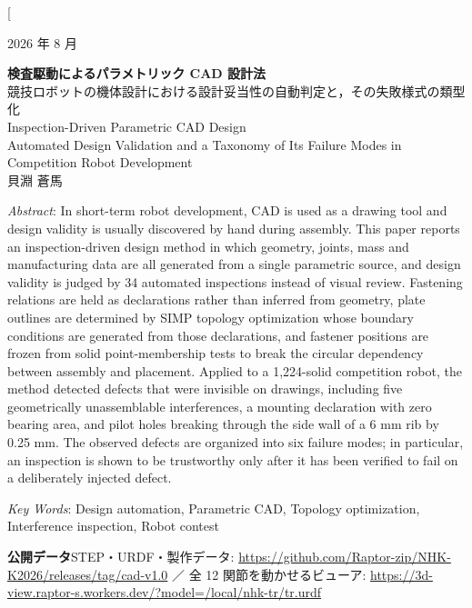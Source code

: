 \documentclass[a4paper,9pt,twocolumn]{ltjsarticle}
\begin{document}
\twocolumn[
\begin{@twocolumnfalse}
\begin{flushright}\footnotesize 2026 年 8 月\end{flushright}
\vspace{-2mm}
\begin{center}
{\large\bfseries 検査駆動によるパラメトリック CAD 設計法}\\
\vspace{1mm}
{\normalsize 競技ロボットの機体設計における設計妥当性の自動判定と，その失敗様式の類型化}\\
\vspace{2mm}
{\normalsize Inspection-Driven Parametric CAD Design}\\
{\footnotesize Automated Design Validation and a Taxonomy of Its Failure Modes
in Competition Robot Development}\\
\vspace{2mm}
{\normalsize 貝淵 蒼馬}
\end{center}
\vspace{1mm}

\begin{center}\vspace{-2mm}
\begin{minipage}{0.93\textwidth}
\footnotesize
\textit{Abstract}: In short-term robot development, CAD is used as a drawing tool
and design validity is usually discovered by hand during assembly.
This paper reports an inspection-driven design method in which geometry, joints,
mass and manufacturing data are all generated from a single parametric source,
and design validity is judged by 34 automated inspections instead of visual review.
Fastening relations are held as declarations rather than inferred from geometry,
plate outlines are determined by SIMP topology optimization whose boundary
conditions are generated from those declarations, and fastener positions are
frozen from solid point-membership tests to break the circular dependency
between assembly and placement.
Applied to a 1,224-solid competition robot, the method detected defects that were
invisible on drawings, including five geometrically unassemblable interferences,
a mounting declaration with zero bearing area, and pilot holes breaking through
the side wall of a 6 mm rib by 0.25 mm.
The observed defects are organized into six failure modes; in particular,
an inspection is shown to be trustworthy only after it has been verified to fail
on a deliberately injected defect.

\vspace{1.2mm}
\noindent\textit{Key Words}: Design automation, Parametric CAD, Topology optimization,
Interference inspection, Robot contest

\vspace{1.2mm}
\noindent\textbf{公開データ}\quad STEP・URDF・製作データ:
\url{https://github.com/Raptor-zip/NHK-K2026/releases/tag/cad-v1.0}
／ 全 12 関節を動かせるビューア:
\url{https://3d-view.raptor-s.workers.dev/?model=/local/nhk-tr/tr.urdf}
\end{minipage}\vspace{-3mm}
\end{center}
\vspace{2mm}
\end{@twocolumnfalse}
\end{document}
